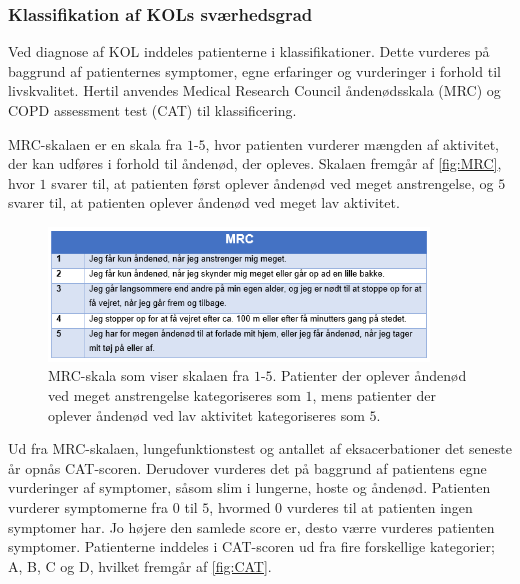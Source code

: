 \subsubsection{Klassifikation af KOLs sværhedsgrad}
Ved diagnose af KOL inddeles patienterne i klassifikationer. Dette vurderes på baggrund af patienternes symptomer, egne erfaringer og vurderinger i forhold til livskvalitet. Hertil anvendes Medical Research Council åndenødsskala (MRC) og COPD assessment test (CAT) til klassificering.\cite{Basisbogen2016}
 
MRC-skalaen er en skala fra $1$-$5$, hvor patienten vurderer mængden af aktivitet, der kan udføres i forhold til åndenød, der opleves. Skalaen fremgår af \autoref{fig:MRC}, hvor $1$ svarer til, at patienten først oplever åndenød ved meget anstrengelse, og $5$ svarer til, at patienten oplever åndenød ved meget lav aktivitet. \cite{Basisbogen2016}

\begin{figure} [H]
\centering
\includegraphics[width=0.9\textwidth]{figures/MRC}
\caption{MRC-skala som viser skalaen fra $1$-$5$. Patienter der oplever åndenød ved meget anstrengelse kategoriseres som $1$, mens patienter der oplever åndenød ved lav aktivitet kategoriseres som $5$.\cite{Basisbogen2016}}
\label{fig:MRC}
\end{figure} 

\noindent
Ud fra MRC-skalaen, lungefunktionstest og antallet af eksacerbationer det seneste år opnås CAT-scoren. Derudover vurderes det på baggrund af patientens egne vurderinger af symptomer, såsom slim i lungerne, hoste og åndenød. Patienten vurderer symptomerne fra $0$ til $5$, hvormed $0$ vurderes til at patienten ingen symptomer har. Jo højere den samlede score er, desto værre vurderes patienten symptomer. \cite{Basisbogen2016, dsam2016} Patienterne inddeles i CAT-scoren ud fra fire forskellige kategorier; A, B, C og D, hvilket fremgår af \autoref{fig:CAT}.

